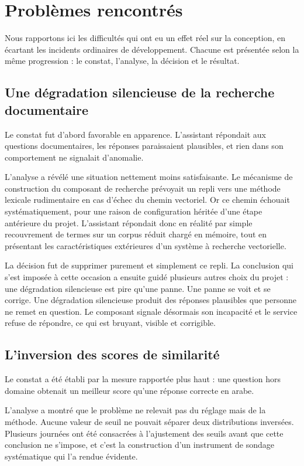 \section{Problèmes rencontrés}

Nous rapportons ici les difficultés qui ont eu un effet réel sur la conception, en écartant les incidents ordinaires de développement. Chacune est présentée selon la même progression : le constat, l'analyse, la décision et le résultat.

\subsection{Une dégradation silencieuse de la recherche documentaire}

Le constat fut d'abord favorable en apparence. L'assistant répondait aux questions documentaires, les réponses paraissaient plausibles, et rien dans son comportement ne signalait d'anomalie.

L'analyse a révélé une situation nettement moins satisfaisante. Le mécanisme de construction du composant de recherche prévoyait un repli vers une méthode lexicale rudimentaire en cas d'échec du chemin vectoriel. Or ce chemin échouait systématiquement, pour une raison de configuration héritée d'une étape antérieure du projet. L'assistant répondait donc en réalité par simple recouvrement de termes sur un corpus réduit chargé en mémoire, tout en présentant les caractéristiques extérieures d'un système à recherche vectorielle.

La décision fut de supprimer purement et simplement ce repli. La conclusion qui s'est imposée à cette occasion a ensuite guidé plusieurs autres choix du projet : une dégradation silencieuse est pire qu'une panne. Une panne se voit et se corrige. Une dégradation silencieuse produit des réponses plausibles que personne ne remet en question. Le composant signale désormais son incapacité et le service refuse de répondre, ce qui est bruyant, visible et corrigible.

\subsection{L'inversion des scores de similarité}

Le constat a été établi par la mesure rapportée plus haut : une question hors domaine obtenait un meilleur score qu'une réponse correcte en arabe.

L'analyse a montré que le problème ne relevait pas du réglage mais de la méthode. Aucune valeur de seuil ne pouvait séparer deux distributions inversées. Plusieurs journées ont été consacrées à l'ajustement des seuils avant que cette conclusion ne s'impose, et c'est la construction d'un instrument de sondage systématique qui l'a rendue évidente.

